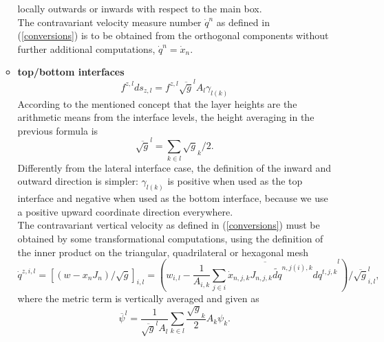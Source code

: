 \begin{itemize}
\begin{itemize}
         locally outwards or inwards with respect to the main box.\\
         The contravariant velocity measure number $\dot{q}^n$ as defined in (\ref{conversions}) is
         to be obtained from the orthogonal components without further additional computations, $\dot{q}^n=\dot{x}_n$.
   \item {\bf top/bottom interfaces}
         \begin{equation}
         f^{z,l}ds_{z,l} = f^{z,l}\overline{\sqrt{g}}^lA_{l}\gamma_{l(k)}
         \label{vertflux}
         \end{equation}
         According to the mentioned concept that the layer heights are the arithmetic means from the
         interface levels, the height averaging in the previous formula is
         $$\overline{\sqrt{g}}^l=\sum_{k\in l}\sqrt{g}_{k}/2.$$
         Differently from the lateral interface case, the definition of the inward and outward direction
         is simpler: $\gamma_{l(k)}$ is positive when used as the top interface and negative when used as
         the bottom interface, because we use a positive upward coordinate direction everywhere.\\
         The contravariant vertical velocity as defined in (\ref{conversions}) must be obtained by some
         transformational computations, using the definition of the inner product on the triangular, quadrilateral or
         hexagonal mesh
         \begin{equation}
          \dot{q}^{z,i,l} =[(w-x_nJ_n)/\sqrt{g}]_{i,l}=
                     \left(w_{i,l}-\overline{\frac{1}{A_{i,k}}\sum_{j\in i}
                     \dot{x}_{n,j,k}J_{n,j,k}\widetilde{dq}^{n,j(i),k}dq^{t,j,k}}^l\right)/\overline{\sqrt{g}}^l_{i,l},
         \label{contrav_velo}
         \end{equation}
         where the metric term is vertically averaged and given as
         \begin{equation}
          \overline\psi^l=\frac{1}{\overline{\sqrt{g}}^lA_l}\sum_{k\in l}\frac{\sqrt{g}_k}{2} A_k \psi_k.
         \label{avel}
         \end{equation}

 \end{itemize}
\end{itemize}

